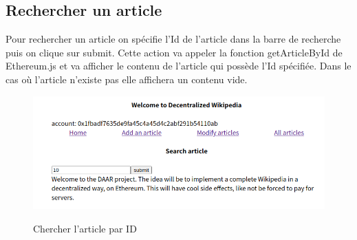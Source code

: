 \documentclass[14px]{article}
\begin{document}
	\clearpage
	\pagestyle{fancy}
	\rhead{\thepage}
	\fancyfoot{}
	
	\subsection{Rechercher un article}
	Pour rechercher un article on spécifie l'Id de l'article dans la barre de recherche puis on clique sur submit. Cette action va appeler la fonction getArticleById de Ethereum.js et va afficher le contenu de l'article qui possède l'Id spécifiée. Dans le cas où l'article n'existe pas elle affichera un contenu vide.
	\begin{figure}[H]
		\begin{minipage}[H]{\linewidth}
			\centering
			\includegraphics[width=\textwidth]{Search01.png}\\
			\caption{Chercher l'article par ID}
			\label{img1}
		\end{minipage}
	\end{figure}
	
	\clearpage
	\pagestyle{fancy}
	\rhead{\thepage}
	\fancyfoot{}
	
\end{document}
